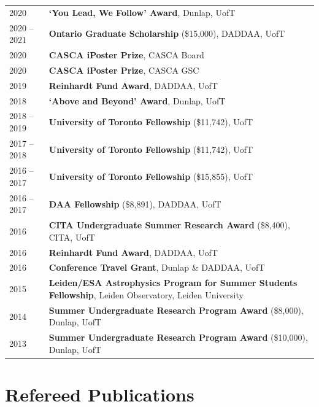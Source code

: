 \documentclass[10pt]{res} %
\begin{document}
\begin{resume}
\begin{table}[h!]
\begin{tabularx}{\textwidth}{lX}
2020 & \textbf{`You Lead, We Follow' Award}, Dunlap, UofT \\
2020 -- 2021 & \textbf{Ontario Graduate Scholarship} (\$15,000), DADDAA, UofT  \\
2020 & \textbf{CASCA iPoster Prize}, CASCA Board \\
2020 & \textbf{CASCA iPoster Prize}, CASCA GSC \\
2019 & \textbf{Reinhardt Fund Award}, DADDAA, UofT \\
2018 & \textbf{`Above and Beyond' Award}, Dunlap, UofT \\
2018 -- 2019 & \textbf{University of Toronto Fellowship} (\$11,742), UofT \\
2017 -- 2018 & \textbf{University of Toronto Fellowship} (\$11,742), UofT \\
2016 -- 2017 & \textbf{University of Toronto Fellowship} (\$15,855), UofT \\
2016 -- 2017 & \textbf{DAA Fellowship} (\$8,891), DADDAA, UofT \\
2016 & \textbf{CITA Undergraduate Summer Research Award} (\$8,400), CITA, UofT \\
2016 & \textbf{Reinhardt Fund Award}, DADDAA, UofT \\
2016 & \textbf{Conference Travel Grant}, Dunlap \& DADDAA, UofT \\
2015 & \textbf{Leiden/ESA Astrophysics Program for Summer Students Fellowship}, Leiden Observatory, Leiden University \\
2014 & \textbf{Summer Undergraduate Research Program Award} (\$8,000), Dunlap, UofT \\
2013 & \textbf{Summer Undergraduate Research Program Award} (\$10,000), Dunlap, UofT
\end{tabularx}
\end{table}


\section{\Large Refereed Publications}
\vspace{-5pt} %
\noindent\makebox[\linewidth]{\rule{\textwidth}{0.4pt}}
\vspace{-15pt} %


\end{resume}
\end{document}
